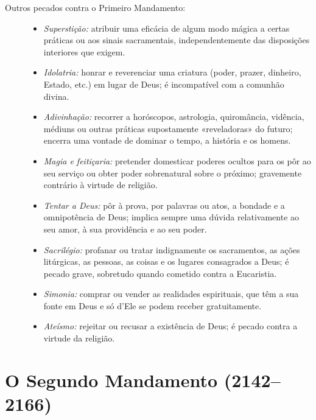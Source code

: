 \begin{description}
    \item[Outros pecados contra o Primeiro Mandamento:]
          \begin{itemize}
              \item \textit{Superstição:} atribuir uma eficácia de algum modo mágica a certas práticas ou aos sinais sacramentais, independentemente das disposições interiores que exigem.
              \item \textit{Idolatria:} honrar e reverenciar uma criatura (poder, prazer, dinheiro, Estado, etc.) em lugar de Deus; é incompatível com a comunhão divina.
              \item \textit{Adivinhação:} recorrer a horóscopos, astrologia, quiromância, vidência, médiuns ou outras práticas supostamente «reveladoras» do futuro; encerra uma vontade de dominar o tempo, a história e os homens.
              \item \textit{Magia e feitiçaria:} pretender domesticar poderes ocultos para os pôr ao seu serviço ou obter poder sobrenatural sobre o próximo; gravemente contrário à virtude de religião.
              \item \textit{Tentar a Deus:} pôr à prova, por palavras ou atos, a bondade e a omnipotência de Deus; implica sempre uma dúvida relativamente ao seu amor, à sua providência e ao seu poder.
              \item \textit{Sacrilégio:} profanar ou tratar indignamente os sacramentos, as ações litúrgicas, as pessoas, as coisas e os lugares consagrados a Deus; é pecado grave, sobretudo quando cometido contra a Eucaristia.
              \item \textit{Simonia:} comprar ou vender as realidades espirituais, que têm a sua fonte em Deus e só d'Ele se podem receber gratuitamente.
              \item \textit{Ateísmo:} rejeitar ou recusar a existência de Deus; é pecado contra a virtude da religião.
          \end{itemize}

\end{description}

\section{O Segundo Mandamento (2142--2166)}

